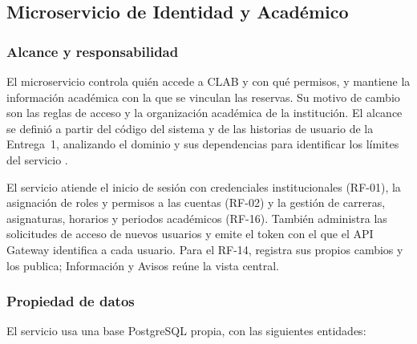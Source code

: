 \subsection{Microservicio de Identidad y Académico}
\label{subsec:identidad-academico}

\subsubsection{Alcance y responsabilidad}

El microservicio controla quién accede a CLAB y con qué permisos, y mantiene
la información académica con la que se vinculan las reservas. Su motivo de
cambio son las reglas de acceso y la organización académica de la
institución. El alcance se definió a partir del código del sistema y de las
historias de usuario de la Entrega~1, analizando el dominio y sus
dependencias para identificar los límites del servicio
\cite{abgaz2023decomposition,oumoussa2024evolution,velepucha2023survey}.

El servicio atiende el inicio de sesión con credenciales institucionales
(RF-01), la asignación de roles y permisos a las cuentas (RF-02) y la gestión
de carreras, asignaturas, horarios y periodos académicos (RF-16). También
administra las solicitudes de acceso de nuevos usuarios y emite el token con
el que el API Gateway identifica a cada usuario. Para el RF-14, registra sus
propios cambios y los publica; Información y Avisos reúne la vista central.

\subsubsection{Propiedad de datos}

El servicio usa una base PostgreSQL propia, con las siguientes entidades:

